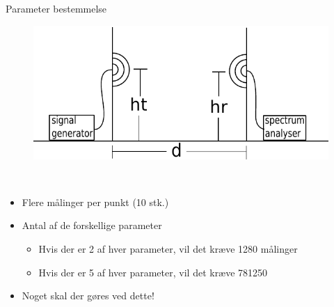 \begin{frame}{Parameter bestemmelse}
\begin{figure}[!htbp]
	\centering
	\includegraphics[width = 0.8\columnwidth]{figures/setup.pdf}
\end{figure}
\begin{minipage}{0.15\textwidth}
 \textcolor{white}{.}  
\end{minipage}%
\begin{minipage}{0.8\textwidth}
\begin{itemize}
\item Flere målinger per punkt (10 stk.) \pause
\item Antal af de forskellige parameter
\begin{itemize}
\item Hvis der er 2 af hver parameter, vil det kræve 1280 målinger
\item Hvis der er 5 af hver parameter, vil det kræve 781250 \pause
\end{itemize}
\item Noget skal der gøres ved dette!
\end{itemize}
\end{minipage}
\end{frame}


